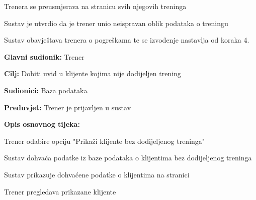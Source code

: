 \begin{packed_item}
\begin{packed_item}
\begin{packed_enum}
								\item Trenera se preusmjerava na stranicu svih njegovih treninga
								
								
							\end{packed_enum}
							\item[9.a] Sustav je utvrdio da je trener unio neispravan oblik podataka o treningu
							\item[] \begin{packed_enum}
								
								\item Sustav obavještava trenera o pogreškama te se izvođenje nastavlja od koraka 4.
								
								
							\end{packed_enum}							
							
						\end{packed_item}
					\end{packed_item}

					

					

				

				    \noindent {}
					\begin{packed_item}
	
						\item \textbf{Glavni sudionik: } Trener
						\item  \textbf{Cilj:} Dobiti uvid u klijente kojima nije dodijeljen trening
						\item  \textbf{Sudionici:} Baza podataka
						\item  \textbf{Preduvjet:} Trener je prijavljen u sustav
						\item  \textbf{Opis osnovnog tijeka:}
						
						\item[] \begin{packed_enum}
	                        
							\item Trener odabire opciju "Prikaži klijente bez dodijeljenog treninga"
							\item Sustav dohvaća podatke iz baze podataka o klijentima bez dodijeljenog treninga
							\item Sustav prikazuje dohvaćene podatke o klijentima na stranici
							\item Trener pregledava prikazane klijente
							
							
						\end{packed_enum}
						
					
					\end{packed_item}
    



